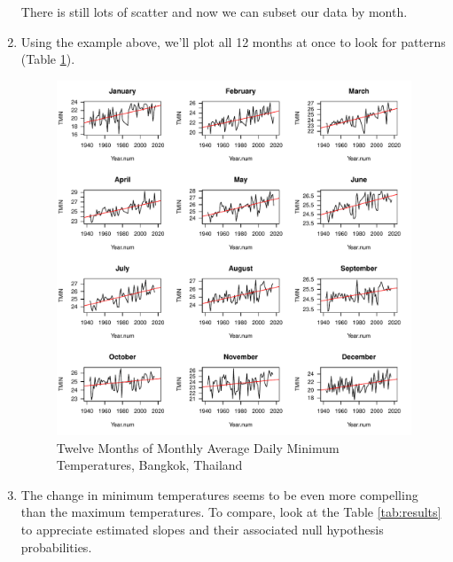 \documentclass{article}\usepackage[]{graphicx}\usepackage[]{color}
\makeatletter
\def\maxwidth{ %
  \ifdim\Gin@nat@width>\linewidth
    \linewidth
  \else
    \Gin@nat@width
  \fi
}
\newenvironment{knitrout}{}{} %
\makeatother
\begin{document}
\begin{enumerate}
\begin{knitrout}
\end{knitrout}

There is still lots of scatter and now we can subset our data by month. 

\item Using the example above, we'll plot all 12 months at once to look for patterns (Table \ref{fig:TMIN}).

\begin{figure}[ht]
\caption{Twelve Months of Monthly Average Daily Minimum 
Temperatures, Bangkok, Thailand}
\label{fig:TMIN}
\begin{knitrout}
\color{fgcolor}
\includegraphics[width=\maxwidth]{figure/12MonthsTMIN-1} 

\end{knitrout}
\end{figure} 
\clearpage

\item The change in minimum temperatures seems to be even more compelling than the maximum temperatures. To compare, look at the Table \ref{tab:results} to appreciate estimated slopes and their associated null hypothesis probabilities. 


\end{enumerate}
\end{document}
